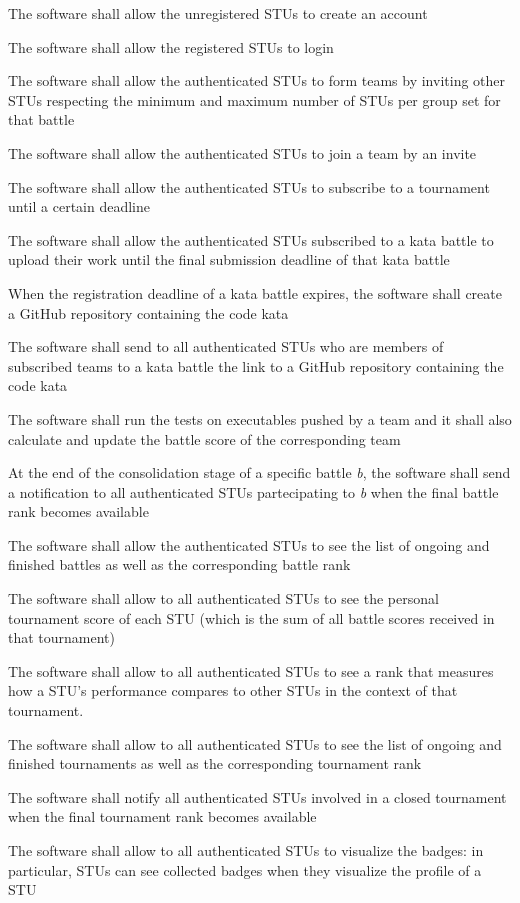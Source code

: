 \begin{requirementsenumerate}[resume]
    \item The software shall allow the unregistered STUs to create an account
    \item The software shall allow the registered STUs to login
    \item The software shall allow the authenticated STUs to form teams by inviting other STUs respecting the minimum and maximum number of STUs per group set for that battle
    \item The software shall allow the authenticated STUs to join a team by an invite
    \item The software shall allow the authenticated STUs to subscribe to a tournament until a certain deadline
    \item The software shall allow the authenticated STUs subscribed to a kata battle to upload their work until the final submission deadline of that kata battle
    \item When the registration deadline of a kata battle expires, the software shall create a GitHub repository containing the code kata
    \item The software shall send to all authenticated STUs who are members of subscribed teams to a kata battle the link to a GitHub repository containing the code kata
    \item The software shall run the tests on executables pushed by a team and it shall also calculate and update the battle score of the corresponding team
    \item At the end of the consolidation stage of a specific battle \textit{b}, the software shall send a notification to all authenticated STUs partecipating to \textit{b} when the final battle rank becomes available
    \item The software shall allow the authenticated STUs to see the list of ongoing and finished battles as well as the corresponding battle rank
    \item The software shall allow to all authenticated STUs to see the personal tournament score of each STU (which is the sum of all battle scores received in that tournament)
    \item The software shall allow to all authenticated STUs to see a rank that measures how a STU's performance compares to other STUs in the context of that tournament.
    \item The software shall allow to all authenticated STUs to see the list of ongoing and finished tournaments as well as the corresponding tournament rank
    \item The software shall notify all authenticated STUs involved in a closed tournament when the final tournament rank becomes available
    \item The software shall allow to all authenticated STUs to visualize the badges: in particular, STUs can see collected badges when they visualize the profile of a STU
\end{requirementsenumerate}


